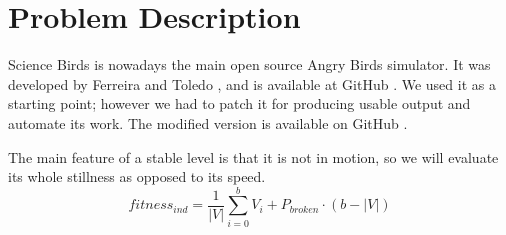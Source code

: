 \documentclass[sigconf]{acmart}
\begin{document}
\section{Problem Description}
\label{sec:angry}

Science Birds is nowadays the main open source Angry Birds
simulator. It was developed by  Ferreira and Toledo
\cite{ferreira2014search}, and is available at 
GitHub \cite{sciencebirds}. We used it  as a starting point; however we
had to patch it for producing usable output 
and automate its work. The modified 
version is available on GitHub \cite{sciencebirds-adapt}.



The main feature of a stable level is that it 
is not in motion, so we will evaluate its whole stillness as 
opposed to its speed. %
$$fitness_{ind} = \frac{1}{|V|}\sum_{i=0}^{b}{V_i} + P_{broken}\cdot(b-|V|)$$
\end{document}
